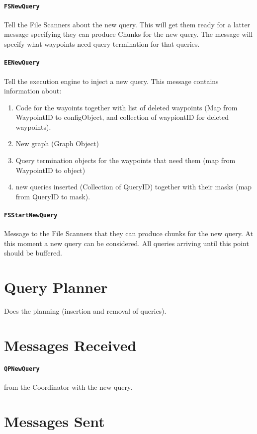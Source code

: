\documentclass[11pt]{article}
\begin{document}
\paragraph*{\texttt{FSNewQuery}} Tell the File Scanners about the new
query. This will get them ready for a latter message specifying they
can produce Chunks for the new query. The message will specify what
waypoints need query termination for that queries.

\paragraph*{\texttt{EENewQuery}} Tell the execution engine to inject a
new query. This message contains information about:
\begin{enumerate}
  \item Code for the wayoints together with list of deleted waypoints
    (Map from WaypointID to configObject, and collection of waypiontID
    for deleted waypoints).
  \item New graph (Graph Object)
  \item Query termination objects for the waypoints that need them
    (map from WaypointID to object)
  \item new queries inserted (Collection of QueryID) together with
    their masks (map from QueryID to mask).
\end{enumerate}

\paragraph*{\texttt{FSStartNewQuery}} Message to the File Scanners
that they can produce chunks for the new query. At this moment a new
query can be considered. All queries arriving until this point should
be buffered.

\section{Query Planner}

Does the planning (insertion and removal of queries). 

\section{Messages Received}

\paragraph*{\texttt{QPNewQuery}} from the Coordinator with the new query.

\section{Messages Sent}
\end{document}
